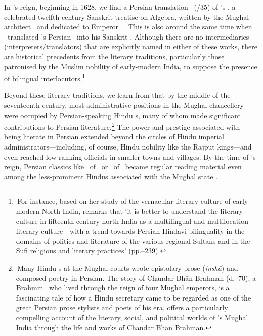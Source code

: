 In \Shahjahan's reign, beginning in 1628, we find a Persian translation \TarjumayiBijganit\ (/35) of \BhaskaraII's  \Bijaganita, a celebrated twelfth-century Sanskrit treatise on Algebra, written by the Mughal architect \AtaAllahRushdi\ and dedicated to Emperor \Shahjahan\ \parencite[384--386]{Ansaribhaskara}. This is also around the same time when \Nityananda\ translated \MullaFarid's Persian \ZijiShahJahani\ into his Sanskrit \Siddhantasindhu. Although there are no intermediaries (interpreters/translators) that are explicitly named in either of these works, there are historical precedents from the literary traditions, particularly those patronised by the Muslim nobility of early-modern India, to suppose the presence of bilingual interlocutors.\footnote{\,For instance, based on her study of the vernacular literary culture of early-modern North India, \textcite{Orsini} remarks that `it is better to understand the literary culture in fifteenth-century north-India as a multilingual and multilocation literary culture---with a trend towards Persian-Hindavi bilinguality in the domains of politics and literature of the various regional Sultans and in the Sufi religious and literary practices' (pp.--239).} 

Beyond these literary traditions, we learn from \textcite[327--328]{AlamPersian1998} that
by the middle of the seventeenth century, most administrative positions in the Mughal chancellery were occupied by Persian-speaking Hindu \munshi s, many of whom made significant contributions to Persian literature.\footnote{\,Many Hindu \munshi s at the Mughal courts wrote epistolary prose (\textit{inshā}) and composed poetry in Persian. The story of Chandar Bhān Brahman (d.\thinspace {}--70), a Brahmin \munshi\ who lived through the reign of four Mughal emperors, is a fascinating tale of how a Hindu secretary came to be regarded as one of the great Persian prose stylists and poets of his era. \textcite{Kinra} offers a particularly compelling account of the literary, social, and political worlds of \Shahjahan's Mughal India through the life and works of Chandar Bhān Brahman.} %
The power and prestige associated with being literate in Persian extended beyond the circles of Hindu imperial administrators---including, of course, Hindu nobility like the Rajput kings---and even reached low-ranking officials in smaller towns and villages. By the time of \Shahjahan's reign, Persian classics like \AkhlaqiNasiri\ of \alTusifull\ or \MasnaviyiManavi\ of \Rumipoet\ became regular reading material even among the less-prominent Hindus associated with the Mughal state \parencite[328]{AlamPersian1998}. 

